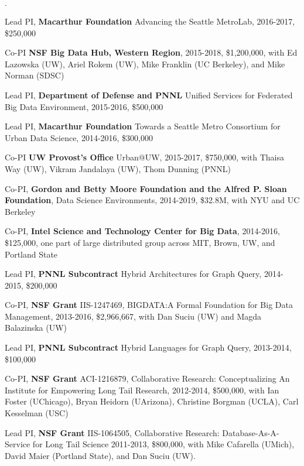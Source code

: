 \documentclass[10pt]{article}
\newenvironment{bulletlist}
   {
      \begin{list}
         {$\cdot$}
         {
            \setlength{\itemsep}{.5ex}
            \setlength{\parsep}{0ex}
            \setlength{\leftmargin}{0.7em}
            \setlength{\parskip}{0ex}
            \setlength{\topsep}{0ex}
         }
   }
   {
      \end{list}
   }
\newcommand{\marginlabel}[1]{
\begin{minipage}[b]{0.8\labelwidth}{\large \textsf{\textbf{#1}}}\end{minipage}}
\newcommand{\entrylabel}[1]{\mbox{\marginlabel{#1}}\hfill}
\newcommand{\MainListlabel}[1]
   {
      \parbox[t]{\labelwidth}{\hspace{.8em}\marginlabel{#1}}
   }
\newenvironment{MainList}[1]
   {
      \renewcommand{\entrylabel}{\MainListlabel}
      \begin{list}{}
      {
         \renewcommand{\makelabel}{\entrylabel}
         \setlength   {\itemindent}{-.65em}
         \setlength   {\labelwidth}{#1}
         \setlength   {\leftmargin}{\labelwidth}
         \setlength   {\itemsep}{3ex}
      }
   }
   {
      \end{list}
   }
\begin{document}
\begin{MainList}{88pt}
\begin{bulletlist}
\item Lead PI, {\bf Macarthur Foundation} Advancing  the Seattle MetroLab, 2016-2017, \$250,000

\item Co-PI {\bf NSF Big Data Hub, Western Region}, 2015-2018, \$1,200,000, with Ed Lazowska (UW), Ariel Rokem (UW), Mike Franklin (UC Berkeley), and Mike Norman (SDSC)

\item Lead PI, {\bf Department of Defense and PNNL} Unified Services for Federated Big Data Environment, 2015-2016, \$500,000

\item Lead PI, {\bf Macarthur Foundation} Towards a Seattle Metro Consortium for Urban Data Science, 2014-2016, \$300,000

\item Co-PI {\bf UW Provost's Office} Urban@UW, 2015-2017, \$750,000, with Thaisa Way (UW), Vikram Jandalaya (UW), Thom Dunning (PNNL)

\item Co-PI, {\bf Gordon and Betty Moore Foundation and the Alfred P. Sloan Foundation}, Data Science Environments, 2014-2019, \$32.8M, with NYU and UC Berkeley

\item Co-PI, {\bf Intel Science and Technology Center for Big Data}, 2014-2016, \$125,000, one part of large distributed group across MIT, Brown, UW, and Portland State

\item Lead PI, {\bf PNNL Subcontract} Hybrid Architectures for Graph Query, 2014-2015, \$200,000

\item Co-PI, {\bf NSF Grant} IIS-1247469, BIGDATA:A Formal Foundation for Big Data Management, 2013-2016, \$2,966,667, with Dan Suciu (UW) and Magda Balazinska (UW)

\item Lead PI, {\bf PNNL Subcontract} Hybrid Languages for Graph Query, 2013-2014, \$100,000

\item Co-PI, {\bf NSF Grant} ACI-1216879, Collaborative Research: Conceptualizing An Institute for Empowering Long Tail Research, 2012-2014, \$500,000, with Ian Foster (UChicago), Bryan Heidorn (UArizona), Christine Borgman (UCLA), Carl Kesselman (USC)

\item Lead PI, {\bf NSF Grant} IIS-1064505, Collaborative Research: Database-As-A-Service for Long Tail Science
2011-2013, \$800,000, with Mike Cafarella (UMich), David Maier (Portland State), and Dan Suciu (UW).


\end{bulletlist}
\end{MainList}
\end{document}
